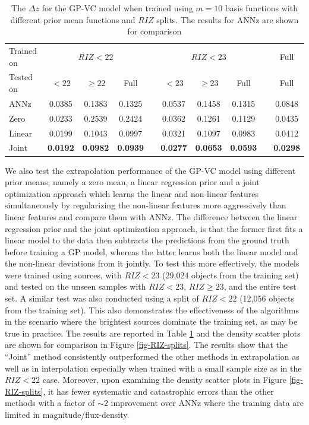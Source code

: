 \documentclass[useAMS,usenatbib,fleqn]{mn2e}
\begin{document}
 \begin{table}
\caption{The $\Delta z$ for the GP-VC model when trained using $m=10$ basis functions with different prior mean functions and $RIZ$ splits. The results for {\sc ANNz} are shown for comparison}
\begin{center}
  \begin{tabular}{| l | c | c | c | c | c | c | c | c | c |}
  	Trained on				& 	\multicolumn{3}{|c|}{ $RIZ<22$}				&	& 	\multicolumn{3}{c}{$RIZ<23$}  &  & Full\\ \cline{2-4} \cline{6-8} \cline{10-10} 
     	Tested on					&	$<22$			&	$\ge 22$		&	Full				&	&	$<23$	&	$\ge 23$	&	Full	& & Full\\	\hline
	{\sc ANNz}						&	0.0385			&	0.1383			&	0.1325			&	&	0.0537&	0.1458	&	0.1315 &  & 0.0848				\\
	Zero						&	0.0233			&	0.2539			&	0.2424			&	&	0.0362&	0.1261	&	0.1129 &  & 0.0435				\\
	Linear						&	0.0199			&	0.1043			&	0.0997			&	&	0.0321	&	0.1097	&	0.0983 &  & 0.0412				\\
	Joint						&	\textbf{0.0192}	&	\textbf{0.0982}	&	\textbf{0.0939}	&	&	\textbf{0.0277}	&	\textbf{0.0653}	&	\textbf{0.0593} &  & \textbf{0.0298}	\\	\hline
  \end{tabular}
\end{center}
\label{table-RIZ-splits}
\end{table}

We also test the extrapolation performance of the GP-VC model using different prior means, namely a zero mean, a linear regression prior and a joint optimization approach which learns the linear and non-linear features simultaneously by regularizing the non-linear features more aggressively than linear features and compare them with {\sc ANNz}. The difference between the linear regression prior and the joint optimization approach, is that the former first fits a linear model to the data then subtracts the predictions from the ground truth before training a GP model, whereas the latter learns both the linear model and the non-linear deviations from it jointly. To test this more effectively,  the models were trained using sources, with $RIZ<23$ (29,024 objects from the training set) and tested on the unseen samples with $RIZ<23$, $RIZ\ge23$, and the entire test set. A similar test was also conducted using a split of $RIZ<22$ (12,056 objects  from the training set). This also demonstrates the effectiveness of the algorithms in the scenario where the brightest sources dominate the training set, as may be true in practice. The results are reported in Table \ref{table-RIZ-splits} and the density scatter plots are shown for comparison in Figure \ref{fig-RIZ-splits}. The results show that the ``Joint'' method consistently outperformed the other methods in extrapolation as well as in interpolation especially when trained with a small sample size as in the $RIZ<22$ case. Moreover, upon examining the density scatter plots in Figure \ref{fig-RIZ-splits}, it has fewer systematic and catastrophic errors than the other methods with a factor of $\sim 2$ improvement over {\sc ANNz} where the training data are limited in magnitude/flux-density.
\end{document}
